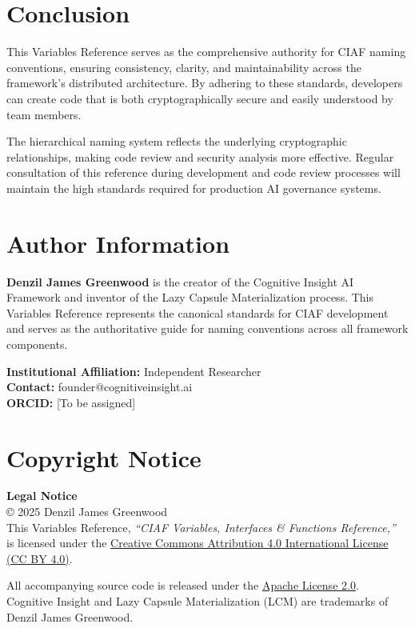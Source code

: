\documentclass[12pt,a4paper]{article}
\begin{document}
\newpage

\section*{Conclusion}

This Variables Reference serves as the comprehensive authority for CIAF naming conventions, ensuring consistency, clarity, and maintainability across the framework's distributed architecture. By adhering to these standards, developers can create code that is both cryptographically secure and easily understood by team members.

The hierarchical naming system reflects the underlying cryptographic relationships, making code review and security analysis more effective. Regular consultation of this reference during development and code review processes will maintain the high standards required for production AI governance systems.

\section*{Author Information}

\textbf{Denzil James Greenwood} is the creator of the Cognitive Insight AI Framework and inventor of the Lazy Capsule Materialization process. This Variables Reference represents the canonical standards for CIAF development and serves as the authoritative guide for naming conventions across all framework components.

\textbf{Institutional Affiliation:} Independent Researcher \\
\textbf{Contact:} founder@cognitiveinsight.ai \\
\textbf{ORCID:} [To be assigned]

\section*{Copyright Notice}

\begin{infobox}
\textbf{Legal Notice}\\
© 2025 Denzil James Greenwood \\
This Variables Reference, \textit{``CIAF Variables, Interfaces \& Functions Reference,''} \\
is licensed under the \href{https://creativecommons.org/licenses/by/4.0/}{Creative Commons Attribution 4.0 International License (CC BY 4.0)}.

All accompanying source code is released under the \href{https://www.apache.org/licenses/LICENSE-2.0}{Apache License 2.0}. \\
Cognitive Insight\texttrademark{} and Lazy Capsule Materialization (LCM)\texttrademark{} are trademarks of Denzil James Greenwood.
\end{infobox}
\end{document}
